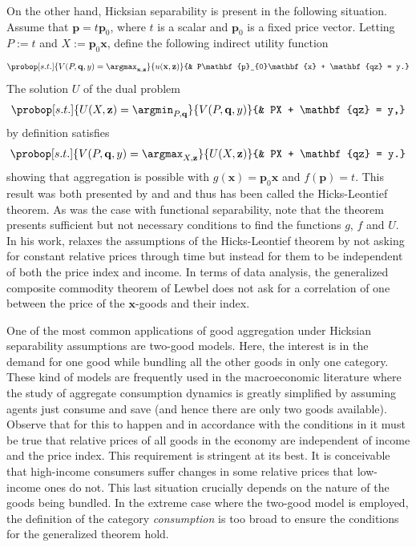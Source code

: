 \documentclass[english, a4paper, 12pt]{article}
\begin{document}
On the other hand, Hicksian separability is present in the following situation. Assume that $\mathbf{p} = t\mathbf{p}_{0}$, where $t$ is a scalar and $\mathbf{p}_{0}$ is a fixed price vector. Letting $P := t$ and $X := \mathbf{p}_{0}\mathbf{x}$, define the following indirect utility function
	$$	\probop[s.t.]{V(P, \mathbf{q}, y) = \argmax_{\mathbf{x}, \mathbf{z}}}{u(\mathbf{x}, \mathbf{z})}
				{&	P\mathbf{p}_{0}\mathbf{x} + \mathbf{qz} = y.}
	$$
The solution $U$ of the dual problem
	$$	\probop[s.t.]{U(X, \mathbf{z}) = \argmin_{P, \mathbf{q}}}{V(P, \mathbf{q},y)}
				{&	PX + \mathbf{qz} = y,}
	$$
by definition satisfies
	$$	\probop[s.t.]{V(P, \mathbf{q}, y) = \argmax_{X, \mathbf{z}}}{U(X, \mathbf{z})}
				{&	PX + \mathbf{qz} = y.}
	$$
showing that aggregation is possible with $g(\mathbf{x}) = \mathbf{p}_{0}\mathbf{x}$ and $f(\mathbf{p}) = t$. This result was both presented by \cite{Leontief36} and \cite{HicksBook} and thus has been called the Hicks-Leontief theorem. As was the case with functional separability, note that the theorem presents sufficient but not necessary conditions to find the functions $g$, $f$ and $U$. In his work, \cite{Lewbel96} relaxes the assumptions of the Hicks-Leontief theorem by not asking for constant relative prices through time but instead for them to be independent of both the price index and income. In terms of data analysis, the generalized composite commodity theorem of Lewbel does not ask for a correlation of one between the price of the $\mathbf{x}$-goods and their index.

One of the most common applications of good aggregation under Hicksian separability assumptions are two-good models. Here, the interest is in the demand for one good while bundling all the other goods in only one category. These kind of models are frequently used in the macroeconomic literature where the study of aggregate consumption dynamics is greatly simplified by assuming agents just consume and save (and hence there are only two goods available). Observe that for this to happen and in accordance with the conditions in \cite{Lewbel96} it must be true that relative prices of all goods in the economy are independent of income and the price index. This requirement is stringent at its best. It is conceivable that high-income consumers suffer changes in some relative prices that low-income ones do not. This last situation crucially depends on the nature of the goods being bundled. In the extreme case where the two-good model is employed, the definition of the category \textit{consumption} is too broad to ensure the conditions for the generalized theorem hold.
\end{document}
